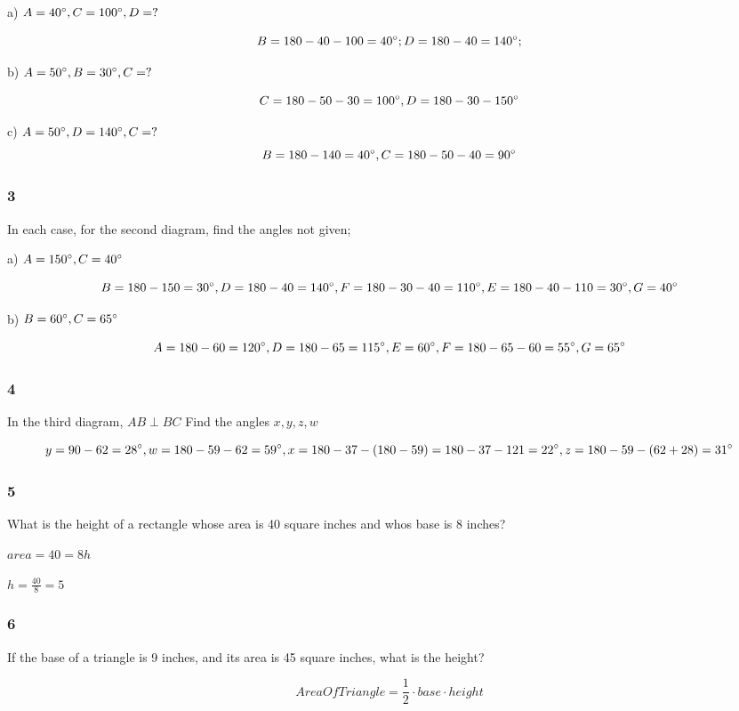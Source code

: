 \documentclass[]{report}
\begin{document}
a) $A=40\degree, C=100\degree, D=?$

\[
B = 180 - 40 - 100 = 40\degree; D = 180 - 40 = 140\degree;
\]

b) $A=50\degree, B=30\degree, C=?$

\[
C = 180 - 50 - 30 = 100\degree, D = 180 - 30 - 150\degree
\]

c) $A=50\degree, D=140\degree, C=?$
\[
B = 180 - 140 = 40\degree, C = 180 - 50 - 40 = 90\degree
\]


\subsubsection{3}

In each case, for the second diagram, find the angles not given;

a) $A=150\degree, C=40\degree$

\[
B = 180 - 150 = 30\degree, D = 180 - 40 = 140\degree, F = 180 - 30 - 40 = 110\degree, E=180-40-110=30\degree, G=40\degree
\]

b) $B=60\degree, C=65\degree$

\[
A = 180 - 60 = 120\degree, D=180-65=115\degree, E=60\degree, F=180-65-60 = 55\degree, G=65\degree
\]

\subsubsection{4}

In the third diagram, $AB \perp BC$ Find the angles $x, y, z, w$

\[
y=90-62=28\degree, w=180-59-62=59\degree, x=180-37-(180-59)=180-37-121=22\degree, z=180-59-(62+28)=31\degree 
\]

\subsubsection{5}
What is the height of a rectangle whose area is 40 square inches and whos base is 8 inches?

$area = 40 = 8h$

$h = \frac{40}{8}=5$

\subsubsection{6} 
If the base of a triangle is 9 inches, and its area is 45 square inches, what is the height?

\[
AreaOfTriangle=\frac{1}{2}\cdot base \cdot height
\]
\end{document}
